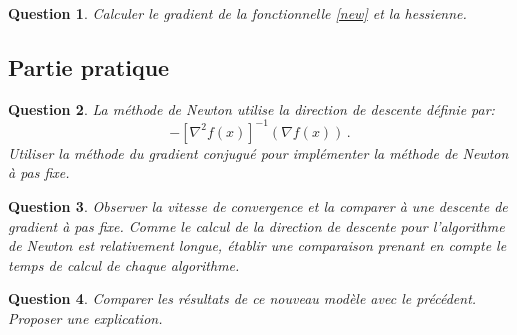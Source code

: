 \documentclass[10pt,a4paper,fleqn]{report}
\newtheorem{question}{Question}
\begin{document}
\begin{question}
Calculer le gradient de la fonctionnelle \eqref{new} et la hessienne.
\end{question}

\subsection{Partie pratique}

\begin{question}
La m\'ethode de Newton utilise la direction de descente d\'efinie par:
$$ -[\nabla^2f(x)]^{-1}(\nabla f(x))\,.$$
Utiliser la m\'ethode du gradient conjugu\'e pour impl\'ementer la m\'ethode de Newton \`a pas fixe.
\end{question}

\begin{question}
Observer la vitesse de convergence et la comparer \`a une descente de gradient \`a pas fixe.
Comme le calcul de la direction de descente pour l'algorithme de Newton est relativement longue, \'etablir une comparaison prenant en compte le temps de calcul de chaque algorithme.
\end{question}

\begin{question}
Comparer les r\'esultats de ce nouveau mod\`ele avec le pr\'ec\'edent. Proposer une explication.
\end{question}
\end{document}
